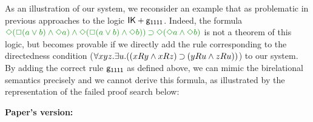 
\begin{remark}
	As an illustration of our system, we reconsider an example that as problematic in previous approaches to the logic $\mathsf{IK} + \mathsf{g_{1111}}$.
	Indeed, the formula $\fm{\DIA(\BOX(a \OR b) \AND \DIA a) \AND \DIA(\BOX(a \OR b) \AND \DIA b)) \IMP \DIA(\DIA a \AND \DIA b)}$ is not a theorem of this logic, but becomes provable if we directly add the rule corresponding to the directedness condition ($\forall xyz. \exists u. ((xRy \mathbin{\wedge} xRz) \mathbin{\supset} (yRu \mathbin{\wedge} zRu))$) to our system.
	By adding the correct rule $\mathsf{g_{1111}}$ as defined above, we can mimic the birelational semantics precisely and we cannot derive this formula, as illustrated by the representation of the failed proof search below:
	
	
	\bigskip
	
	\textbf{Paper's version:}
	
	
	

\end{remark}
